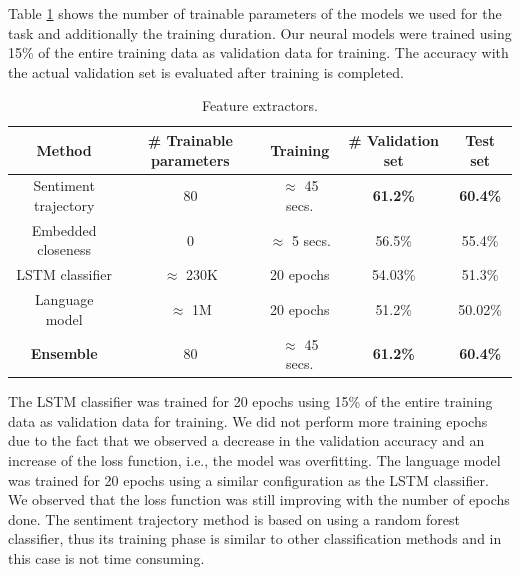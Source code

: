 \documentclass{article}
\newcommand{\lstm}{LSTM }
\begin{document}
Table \ref{tab:params} shows the number of trainable parameters of the models we
used for the task and additionally the training duration. Our neural models were
trained using 15\% of the entire training data as validation data for training.
The accuracy with the actual validation set is evaluated after training is
completed. 
\begin{table}[h!]
    \begin{center}
        \begin{tabular}{||c c c c c||} 
            \hline
            Method                 & \# Trainable parameters   & Training               & \# Validation set         & Test set \\ [0.5ex] 
            \hline\hline
            Sentiment trajectory   & 80                        & $ \approx $ 45 secs.   & \textbf{61.2\%}           & \textbf{60.4\%} \\ 
            \hline
            Embedded closeness     & 0                         & $ \approx $ 5 secs.    & 56.5\%                    & 55.4\% \\
            \hline
            LSTM classifier        & $ \approx $ 230K          & 20 epochs              & 54.03\%                   & 51.3\% \\ 
            \hline
            Language model         & $ \approx $ 1M            & 20 epochs              & 51.2\%                    & 50.02\% \\
            \hline
            \textbf{Ensemble}      & 80                        & $ \approx $ 45 secs.   & \textbf{61.2\%}           & \textbf{60.4\%} \\ [1ex] 
            \hline
        \end{tabular}    
    \end{center}
\caption{Feature extractors.}
\label{tab:params}
\end{table}
\vspace*{-0.5cm}

The \lstm classifier was trained for 20 epochs using 15\% of the entire training
data as validation data for training. We did not perform more training epochs
due to the fact that we observed a decrease in the validation accuracy and an
increase of the loss function, i.e., the model was overfitting.  The language
model was trained for 20 epochs using a similar configuration as the \lstm
classifier. We observed that the loss function was still improving with the
number of epochs done. The sentiment trajectory method is based on using a
random forest classifier, thus its training phase is similar to other
classification methods and in this case is not time consuming.
\end{document}
